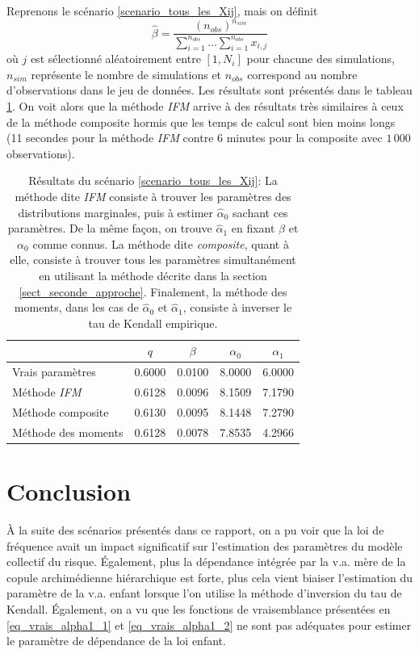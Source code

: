 \documentclass[11pt]{article}
\begin{document}
 		Reprenons le scénario \ref{scenario_tous_les_Xij}, mais on définit 
 		$$\hat{\beta} = \frac{(n_{obs}) ^ {n_{sim}}}{\sum_{i=1}^{n_{obs}} \dots \sum_{i=1}^{n_{obs}} x_{i,j}} $$
 		où $j$ est sélectionné aléatoirement entre $\left[1, N_i\right]$ pour chacune des simulations, $n_{sim}$ représente le nombre de simulations et $n_{obs}$ correspond au nombre d'observations dans le jeu de données. Les résultats sont présentés dans le tableau \ref{tbl_resultats_scenario_4}. On voit alors que la méthode \textit{IFM} arrive à des résultats très similaires à ceux de la méthode composite hormis que les temps de calcul sont bien moins longs (11 secondes pour la méthode \textit{IFM} contre 6 minutes pour la composite avec $1\,000$ observations).
 		
 		\begin{table}[H]
 			\centering
 			\begin{tabular}{lcccc}
 				\hline
 				& $q$ & $\beta$ & $\alpha_0$ & $\alpha_1$ \\ 
 				\hline
 				Vrais paramètres & 0.6000 & 0.0100 & 8.0000 & 6.0000 \\ 
 				Méthode \textit{IFM} & 0.6128 & 0.0096 & 8.1509 & 7.1790 \\ 
 				Méthode composite & 0.6130 & 0.0095 & 8.1448 & 7.2790 \\ 
 				Méthode des moments & 0.6128 & 0.0078 & 7.8535 & 4.2966 \\
 				\hline
 			\end{tabular}
 			\caption[Résultats du scénario \ref{scenario_selection_aleatoire_Xij}]{Résultats du scénario \ref{scenario_tous_les_Xij}: La méthode dite \textit{IFM} consiste à trouver les paramètres des distributions marginales, puis à estimer $\hat{\alpha}_{0}$ sachant ces paramètres. De la même façon, on trouve $\hat{\alpha}_{1}$ en fixant $\beta$ et $\alpha_{0}$ comme connus. La méthode dite \textit{composite}, quant à elle, consiste à trouver tous les paramètres simultanément en utilisant la méthode décrite dans la section \ref{sect_seconde_approche}. Finalement, la méthode des moments, dans les cas de $\hat{\alpha}_{0}$ et $\hat{\alpha}_{1}$, consiste à inverser le tau de Kendall empirique.}
 			\label{tbl_resultats_scenario_4}	
 		\end{table}
 	
 	\section{Conclusion}
		 À la suite des scénarios présentés dans ce rapport, on a pu voir que la loi de fréquence avait un impact significatif sur l'estimation des paramètres du modèle collectif du risque. Également, plus la dépendance intégrée par la v.a. mère de la copule archimédienne hiérarchique est forte, plus cela vient biaiser l'estimation du paramètre de la v.a. enfant lorsque l'on utilise la méthode d'inversion du tau de Kendall.
		 Également, on a vu que les fonctions de vraisemblance présentées en \eqref{eq_vrais_alpha1_1} et \eqref{eq_vrais_alpha1_2} ne sont pas adéquates pour estimer le paramètre de dépendance de la loi enfant.\\
		 
\end{document}
